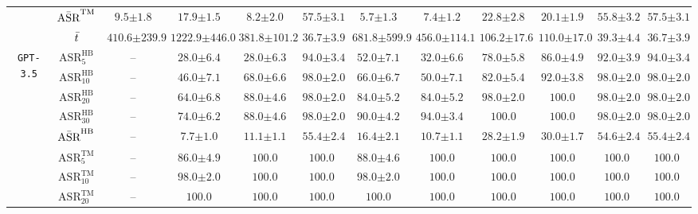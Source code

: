 \begin{table*}[t]
{\begin{tabular}{c|c||c|c|c||c|c|c|c||c|c|c}
& $\Bar{\text{ASR}}^{\text{TM}}$ & $9.5{\pm 1.8}$ & $17.9{\pm 1.5}$ & $8.2{\pm 2.0}$ & $\mathbf{57.5{\pm 3.1}}$ & $5.7{\pm 1.3}$ & $7.4{\pm 1.2}$ & $22.8{\pm 2.8}$ & $20.1{\pm 1.9}$ & $55.8{\pm 3.2}$ & $\mathbf{57.5{\pm 3.1}}$ \\
\cline{2-12}
& $\Bar{t}$ & $410.6{\pm 239.9}$ & $1222.9{\pm 446.0}$ & $381.8{\pm 101.2}$ & $\mathbf{36.7{\pm 3.9}}$ & $681.8{\pm 599.9}$ & $456.0{\pm 114.1}$ & $106.2{\pm 17.6}$ & $110.0{\pm 17.0}$ & $39.3{\pm 4.4}$ & $\mathbf{36.7{\pm 3.9}}$ \\
\hline
\hline
\multirow{11}{*}{\texttt{GPT-3.5}} 
& $\text{ASR}^{\text{HB}}_{5}$ & -- & $28.0{\pm 6.4}$ & $28.0{\pm 6.3}$ & $\mathbf{94.0{\pm 3.4}}$ & $52.0{\pm 7.1}$ & $32.0{\pm 6.6}$ & $78.0{\pm 5.8}$ & $86.0{\pm 4.9}$ & $92.0{\pm 3.9}$ & $\mathbf{94.0{\pm 3.4}}$ \\
& $\text{ASR}^{\text{HB}}_{10}$ & -- & $46.0{\pm 7.1}$ & $68.0{\pm 6.6}$ & $\mathbf{98.0{\pm 2.0}}$ & $66.0{\pm 6.7}$ & $50.0{\pm 7.1}$ & $82.0{\pm 5.4}$ & $92.0{\pm 3.8}$ & $\mathbf{98.0{\pm 2.0}}$ & $\mathbf{98.0{\pm 2.0}}$ \\
& $\text{ASR}^{\text{HB}}_{20}$ & -- & $64.0{\pm 6.8}$ & $88.0{\pm 4.6}$ & $98.0{\pm 2.0}$ & $84.0{\pm 5.2}$ & $84.0{\pm 5.2}$ & $98.0{\pm 2.0}$ & $\mathbf{100.0}$ & $98.0{\pm 2.0}$ & $98.0{\pm 2.0}$ \\
& $\text{ASR}^{\text{HB}}_{30}$ & -- & $74.0{\pm 6.2}$ & $88.0{\pm 4.6}$ & $98.0{\pm 2.0}$ & $90.0{\pm 4.2}$ & $94.0{\pm 3.4}$ & $\mathbf{100.0}$ & $\mathbf{100.0}$ & $98.0{\pm 2.0}$ & $98.0{\pm 2.0}$ \\
& $\Bar{\text{ASR}}^{\text{HB}}$ & -- & $7.7{\pm 1.0}$ & $11.1{\pm 1.1}$ & $\mathbf{55.4{\pm 2.4}}$ & $16.4{\pm 2.1}$ & $10.7{\pm 1.1}$ & $28.2{\pm 1.9}$ & $30.0{\pm 1.7}$ & $54.6{\pm 2.4}$ & $55.4{\pm 2.4}$ \\
\cline{2-12}
& $\text{ASR}^{\text{TM}}_{5}$ & -- & $86.0{\pm 4.9}$ & $\mathbf{100.0}$ & $\mathbf{100.0}$ & $88.0{\pm 4.6}$ & $\mathbf{100.0}$ & $\mathbf{100.0}$ & $\mathbf{100.0}$ & $\mathbf{100.0}$ & $\mathbf{100.0}$ \\
& $\text{ASR}^{\text{TM}}_{10}$ & -- & $98.0{\pm 2.0}$ & $\mathbf{100.0}$ & $\mathbf{100.0}$ & $98.0{\pm 2.0}$ & $\mathbf{100.0}$ & $\mathbf{100.0}$ & $\mathbf{100.0}$ & $\mathbf{100.0}$ & $\mathbf{100.0}$ \\
& $\text{ASR}^{\text{TM}}_{20}$ & -- & $\mathbf{100.0}$ & $\mathbf{100.0}$ & $\mathbf{100.0}$ & $\mathbf{100.0}$ & $\mathbf{100.0}$ & $\mathbf{100.0}$ & $\mathbf{100.0}$ & $\mathbf{100.0}$ & $\mathbf{100.0}$ \\

\end{tabular}}
\end{table*}
